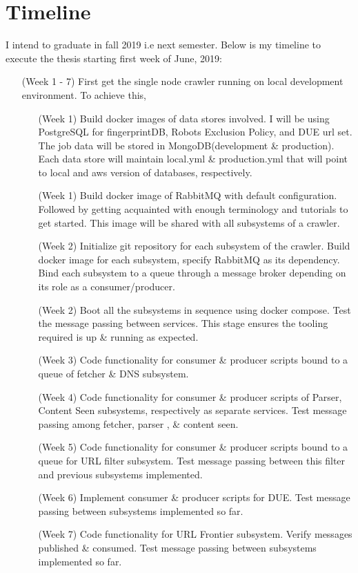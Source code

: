\chapter{Timeline}
I intend to graduate in fall 2019 i.e next semester. Below is my timeline to execute the thesis starting
first week of June, 2019:
\begin{itemize}
\item[(Week 1 - 7)] First get the single node crawler running on local development environment. To achieve this,
  \begin{itemize}
  \item[(Week 1)] Build docker images of data stores involved. I will be using PostgreSQL for
    fingerprintDB, Robots Exclusion Policy, and DUE url set. The job data will be stored in MongoDB(development \& production). Each data store will maintain local.yml \& production.yml that will point to local and aws version of databases, respectively.
  \item[(Week 1)] Build docker image of RabbitMQ with default configuration. Followed by getting acquainted with enough terminology and tutorials to get started. This image will be shared with all subsystems of a
    crawler.
  \item [(Week 2)]Initialize git repository for each subsystem of the crawler. Build docker image for each subsystem,
    specify RabbitMQ as its dependency. Bind each subsystem to a queue through a message broker depending
    on its role as a consumer/producer.
  \item[(Week 2)] Boot all the subsystems in sequence using docker compose. Test the message passing between services. This stage ensures the tooling required is up \& running as expected.
  \item[(Week 3)] Code functionality for consumer \& producer scripts bound to a queue of fetcher \& DNS subsystem. 
  \item[(Week 4)] Code functionality for consumer \& producer scripts of Parser, Content Seen subsystems, respectively as separate services. Test message passing among fetcher, parser , \& content seen.
  \item[(Week 5)] Code functionality for consumer \& producer scripts bound to a queue for URL filter subsystem. Test message passing between this filter and previous subsystems implemented.
  \item[(Week 6)] Implement consumer \& producer scripts for DUE. Test message passing between subsystems implemented so far.
  \item[(Week 7)] Code functionality for URL Frontier subsystem. Verify messages published \& consumed. Test message passing between subsystems implemented so far.

\end{itemize}
\end{itemize}
